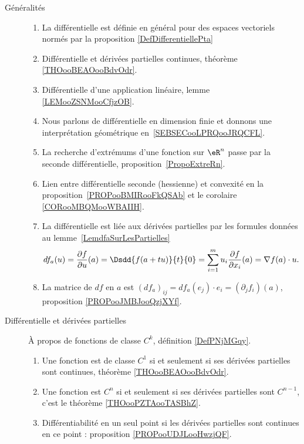 \begin{description}
	\item[Généralités]
		\begin{enumerate}
			\item
			      La différentielle est définie en général pour des espaces vectoriels normés par la proposition \ref{DefDifferentiellePta}
			\item
			      Différentielle et dérivées partielles continues, théorème \ref{THOooBEAOooBdvOdr}.
			\item
			      Différentielle d'une application linéaire, lemme \ref{LEMooZSNMooCfjzOB}.
			\item
			      Nous parlons de différentielle en dimension finie et donnons une interprétation géométrique en~\ref{SEBSECooLPRQooJRQCFL}.
			\item
			      La recherche d'extrémums d'une fonction sur \( \eR^n\) passe par la seconde différentielle, proposition~\ref{PropoExtreRn}.
			\item
			      Lien entre différentielle seconde (hessienne) et convexité en la proposition~\ref{PROPooBMIRooFkQSAb} et le corolaire \ref{CORooMBQMooWBAIIH}.
			\item
			      La différentielle est liée aux dérivées partielles par les formules données au lemme~\ref{LemdfaSurLesPartielles}
			      \begin{equation}
				      df_a(u)=\frac{ \partial f }{ \partial u }(a)=\Dsdd{ f(a+tu) }{t}{0}=\sum_{i=1}^mu_i\frac{ \partial f }{ \partial x_i }(a)=\nabla f(a)\cdot u.
			      \end{equation}
			\item
			      La matrice de \( df\) en \( a\) est \( (df_a)_{ij}=df_a(e_j)\cdot e_i=(\partial_jf_i)(a)\), proposition \ref{PROPooJMBJooQzjXYf}.
		\end{enumerate}
	\item[Différentielle et dérivées partielles]
		À propos de fonctions de classe \( C^k\), définition \ref{DefPNjMGqy}.
		\begin{enumerate}
			\item
			      Une fonction est de classe \( C^1\) si et seulement si ses dérivées partielles sont continues, théorème \ref{THOooBEAOooBdvOdr}.
			\item
			      Une fonction est \( C^n\) si et seulement si ses dérivées partielles sont \( C^{n-1}\), c'est le théorème \ref{THOooPZTAooTASBhZ}.
			\item
			      Différentiabilité en un seul point si les dérivées partielles sont continues en ce point : proposition \ref{PROPooUDJLooHwzjQF}.

\end{enumerate}
\end{description}
